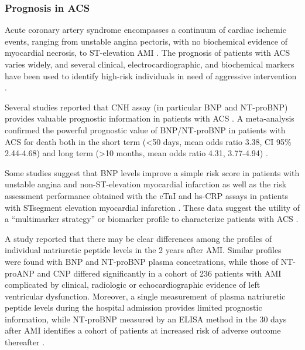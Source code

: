 \documentclass[14pt,a4paper,onecolumn]{extarticle}
\begin{document}
\subsubsection{ Prognosis in ACS}

Acute coronary artery syndrome encompasses a continuum of cardiac ischemic events, ranging from unstable angina pectoris, with no biochemical evidence of myocardial necrosis, to ST-elevation AMI \citep{bib3221} \citep{bib3222}. The prognosis of patients with ACS varies widely, and several clinical, electrocardiographic, and biochemical markers have been used to identify high-risk individuals in need of aggressive intervention \citep{bib3222}.

Several studies reported that CNH assay (in particular BNP and NT-proBNP) provides valuable prognostic information in patients with ACS \citep{bib3117} \citep{bib3138} \citep{bib3223} \citep{bib3224} \citep{bib3225} \citep{bib3226} \citep{bib3227} \citep{bib3228} \citep{bib3229} \citep{bib3230} \citep{bib3231}. A meta-analysis confirmed the powerful prognostic value of BNP/NT-proBNP in patients with ACS for death both in the short term (<50 days, mean odds ratio 3.38, CI 95\% 2.44-4.68) and long term (>10 months, mean odds ratio 4.31, 3.77-4.94) \citep{bib376}.

Some studies suggest that BNP levels improve a simple risk score in patients with unstable angina and non-ST-elevation myocardial infarction \citep{bib3239} as well as the risk assessment performance obtained with the cTnI and hs-CRP assays in patients with STsegment elevation myocardial infarction \citep{bib3234}. These data suggest the utility of a “multimarker strategy” or biomarker profile to characterize patients with ACS \citep{bib378}.

A study reported that there may be clear differences among the profiles of individual natriuretic peptide levels in the 2 years after AMI. Similar profiles were found with BNP and NT-proBNP plasma concetrations, while those of NT-proANP and CNP differed significantly in a cohort of 236 patients with AMI complicated by clinical, radiologic or echocardiographic evidence of left ventricular dysfunction. Moreover, a single measurement of plasma natriuretic peptide levels during the hospital admission provides limited prognostic information, while NT-proBNP measured by an ELISA method in the 30 days after AMI identifies a cohort of patients at increased risk of adverse outcome thereafter \citep{bib3240}.
\end{document}
